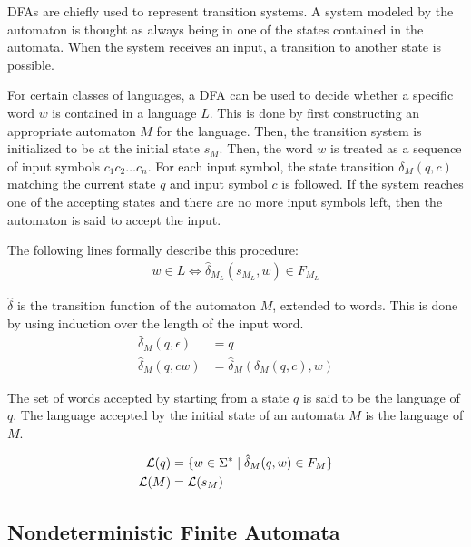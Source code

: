 DFAs are chiefly used to represent transition systems.
A system modeled by the automaton is thought as always being in one of the states contained in the automata.
When the system receives an input, a transition to another state is possible.

For certain classes of languages, a DFA can be used to decide whether a specific word $w$ is contained in a language $L$.
This is done by first constructing an appropriate automaton $M$ for the language.
Then, the transition system is initialized to be at the initial state $s_{M}$.
Then, the word $w$ is treated as a sequence of input symbols $c_1 c_2 \ldots c_n$.
For each input symbol, the state transition $\delta_{M}(q, c)$ matching the current state $q$ and input symbol $c$ is followed.
If the system reaches one of the accepting states and there are no more input symbols left, then the
automaton is said to accept the input.

The following lines formally describe this procedure:
\begin{align}
    w \in L \Leftrightarrow \hat\delta_{M_L}(s_{M_L}, w) \in F_{M_L}
\end{align}

\begin{definition}
    $\hat\delta$ is the transition function of the automaton $M$, extended to words.
    This is done by using induction over the length of the input word.
    \begin{align}
        \hat\delta_M(q, \epsilon) &= q\\
        \hat\delta_M(q, c w) &= \hat\delta_M(\delta_M(q, c), w)
    \end{align}
\end{definition}

\begin{definition}
    The set of words accepted by starting from a state $q$ is said to be the language of $q$.
    The language accepted by the initial state of an automata $M$ is the language of $M$.

    \begin{align}
        \mathcal{L}(q) &= \{ w \in \Sigma^\ast \mid \hat\delta_M(q, w) \in F_M \}\\
        \mathcal{L}(M) &= \mathcal{L}(s_M)
    \end{align}
\end{definition}

\subsection{Nondeterministic Finite Automata}

